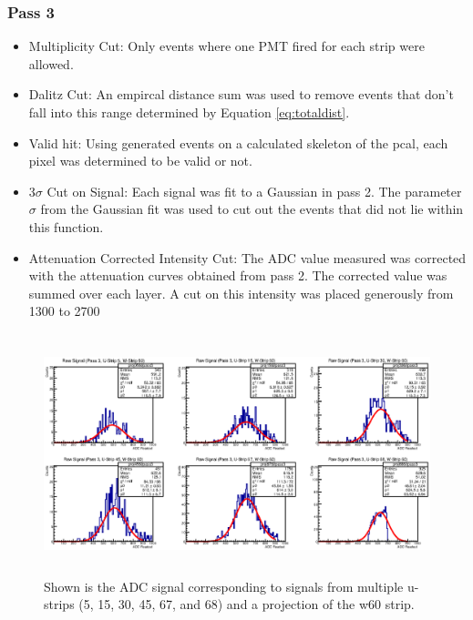 \subsubsection{Pass 3}
\begin{itemize}
    \item Multiplicity Cut: Only events where one PMT fired for each strip were allowed.
    \item Dalitz Cut: An empircal distance sum was used to remove events that don't fall 
    into this range determined by Equation \ref{eq:totaldist}.
    \item Valid hit: Using generated events on a calculated skeleton of the pcal, each 
    pixel was determined to be valid or not.
    \item 3$\sigma$ Cut on Signal: Each signal was fit to a Gaussian in pass 2. The parameter 
    $\sigma$ from the Gaussian fit was used to cut out the events that did not lie within this function.
    \item Attenuation Corrected Intensity Cut: The ADC value measured was corrected with the 
    attenuation curves obtained from pass 2. The corrected value was summed over each layer. 
    A cut on this intensity was placed generously from 1300 to 2700
\end{itemize}

\begin{figure}[h]
    \centering
    \includegraphics[height= 2.75in, keepaspectratio = true]{pass3}
    \caption{Shown is the ADC signal corresponding to signals from multiple u-strips 
    (5, 15, 30, 45, 67, and 68) and a projection of the w60 strip.}
    \label{fig:pass3}
\end{figure}

